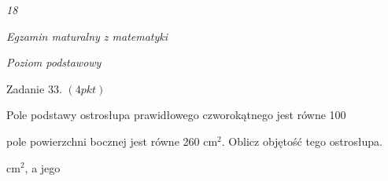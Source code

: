 \documentclass[a4paper,12pt]{article}
\begin{document}
{\it 18}

{\it Egzamin maturalny z matematyki}

{\it Poziom podstawowy}

Zadanie 33. $(4pkt)$

Pole podstawy ostrosłupa prawidłowego czworokątnego jest równe 100

pole powierzchni bocznej jest równe 260 $\mathrm{c}\mathrm{m}^{2}$. Oblicz objętość tego ostrosłupa.

$\mathrm{c}\mathrm{m}^{2}$, a jego
\end{document}
